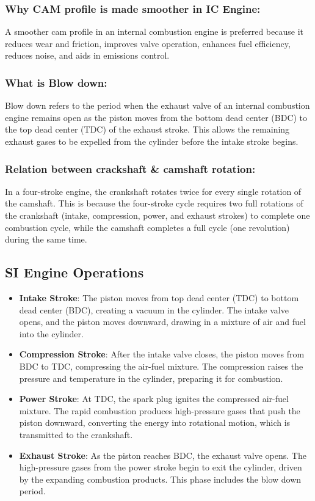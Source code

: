 \documentclass{article}
\begin{document}
\subsubsection*{Why CAM profile is made smoother in IC Engine:}
A smoother cam profile in an internal combustion engine is preferred because it reduces wear and friction, improves valve operation, enhances fuel efficiency, reduces noise, and aids in emissions control.

\subsubsection*{What is Blow down:}
Blow down refers to the period when the exhaust valve of an internal combustion engine remains open as the piston moves from the bottom dead center (BDC) to the top dead center (TDC) of the exhaust stroke. This allows the remaining exhaust gases to be expelled from the cylinder before the intake stroke begins.

\subsubsection*{Relation between crackshaft \& camshaft rotation: }
In a four-stroke engine, the crankshaft rotates twice for every single rotation of the camshaft. This is because the four-stroke cycle requires two full rotations of the crankshaft (intake, compression, power, and exhaust strokes) to complete one combustion cycle, while the camshaft completes a full cycle (one revolution) during the same time.


\subsection*{SI Engine Operations}
\begin{itemize}
	\item \textbf{Intake Stroke}: The piston moves from top dead center (TDC) to bottom dead center (BDC), creating a vacuum in the cylinder. The intake valve opens, and the piston moves downward, drawing in a mixture of air and fuel into the cylinder.
	\item \textbf{Compression Stroke}: After the intake valve closes, the piston moves from BDC to TDC, compressing the air-fuel mixture. The compression raises the pressure and temperature in the cylinder, preparing it for combustion.
	\item \textbf{Power Stroke}: At TDC, the spark plug ignites the compressed air-fuel mixture. The rapid combustion produces high-pressure gases that push the piston downward, converting the energy into rotational motion, which is transmitted to the crankshaft.
	\item \textbf{Exhaust Stroke}: As the piston reaches BDC, the exhaust valve opens. The high-pressure gases from the power stroke begin to exit the cylinder, driven by the expanding combustion products. This phase includes the blow down period.
\end{itemize}
\end{document}
